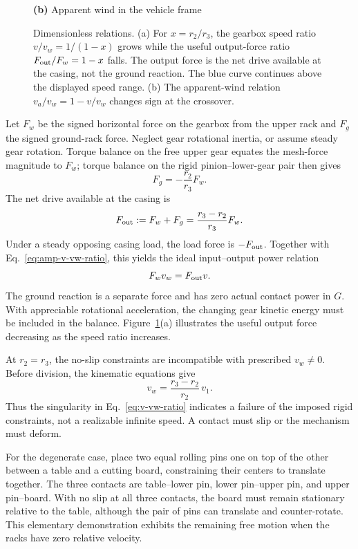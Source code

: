 \documentclass[reprint,aps,pra,longbibliography]{revtex4-2}
\begin{document}
\begin{figure}[t]
\begin{minipage}{0.48\textwidth}
\vspace{1mm}
\textbf{(b)} Apparent wind in the vehicle frame
\end{minipage}

\caption{Dimensionless relations. (a) For \(x=r_2/r_3\), the gearbox speed ratio \(v/v_w=1/(1-x)\) grows while the useful output-force ratio \(F_{\rm out}/F_w=1-x\) falls. The output force is the net drive available at the casing, not the ground reaction. The blue curve continues above the displayed speed range. (b) The apparent-wind relation \(v_a/v_w=1-v/v_w\) changes sign at the crossover.}
\label{fig:dimensionless_plots}
\end{figure}


Let \(F_w\) be the signed horizontal force on the gearbox from the upper rack and \(F_g\) the signed ground-rack force. Neglect gear rotational inertia, or assume steady gear rotation. Torque balance on the free upper gear equates the mesh-force magnitude to \(F_w\); torque balance on the rigid pinion--lower-gear pair then gives
\begin{equation}
F_g=-\frac{r_2}{r_3}F_w.
\label{eq:downwind-ground-force}
\end{equation}
The net drive available at the casing is
\begin{equation}
F_{\rm out}:=F_w+F_g=\frac{r_3-r_2}{r_3}F_w.
\label{eq:downwind-output-force}
\end{equation}
Under a steady opposing casing load, the load force is \(-F_{\rm out}\). Together with Eq.~\eqref{eq:amp-v-vw-ratio}, this yields the ideal input--output power relation
\begin{equation}
F_wv_w=F_{\rm out}v.
\label{eq:gearbox-power}
\end{equation}
The ground reaction is a separate force and has zero actual contact power in \(G\). With appreciable rotational acceleration, the changing gear kinetic energy must be included in the balance. Figure~\ref{fig:dimensionless_plots}(a) illustrates the useful output force decreasing as the speed ratio increases.



At \(r_2=r_3\), the no-slip constraints are incompatible with prescribed \(v_w\neq0\). Before division, the kinematic equations give
\[
v_w=\frac{r_3-r_2}{r_2}\,v_1.
\]
Thus the singularity in Eq.~\eqref{eq:v-vw-ratio} indicates a failure of the imposed rigid constraints, not a realizable infinite speed. A contact must slip or the mechanism must deform.

For the degenerate case, place two equal rolling pins one on top of the other between a table and a cutting board, constraining their centers to translate together. The three contacts are table--lower pin, lower pin--upper pin, and upper pin--board. With no slip at all three contacts, the board must remain stationary relative to the table, although the pair of pins can translate and counter-rotate. This elementary demonstration exhibits the remaining free motion when the racks have zero relative velocity.
\end{document}
